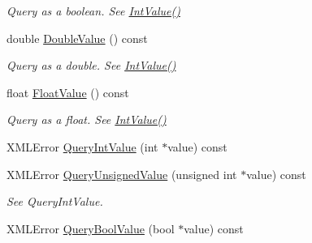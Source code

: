 \begin{DoxyCompactItemize}
\begin{DoxyCompactList}\small\item\em Query as a boolean. See \hyperlink{classtinyxml2_1_1_x_m_l_attribute_a949d02a5888092cc68c1e29185301863}{Int\+Value()} \end{DoxyCompactList}\item 
\hypertarget{classtinyxml2_1_1_x_m_l_attribute_a336153e5aa1b7ccd6502fc249bfb3fd7}{}double \hyperlink{classtinyxml2_1_1_x_m_l_attribute_a336153e5aa1b7ccd6502fc249bfb3fd7}{Double\+Value} () const \label{classtinyxml2_1_1_x_m_l_attribute_a336153e5aa1b7ccd6502fc249bfb3fd7}

\begin{DoxyCompactList}\small\item\em Query as a double. See \hyperlink{classtinyxml2_1_1_x_m_l_attribute_a949d02a5888092cc68c1e29185301863}{Int\+Value()} \end{DoxyCompactList}\item 
\hypertarget{classtinyxml2_1_1_x_m_l_attribute_ae3d51ff98eacc1dc46efcfdaee5c84ad}{}float \hyperlink{classtinyxml2_1_1_x_m_l_attribute_ae3d51ff98eacc1dc46efcfdaee5c84ad}{Float\+Value} () const \label{classtinyxml2_1_1_x_m_l_attribute_ae3d51ff98eacc1dc46efcfdaee5c84ad}

\begin{DoxyCompactList}\small\item\em Query as a float. See \hyperlink{classtinyxml2_1_1_x_m_l_attribute_a949d02a5888092cc68c1e29185301863}{Int\+Value()} \end{DoxyCompactList}\item 
X\+M\+L\+Error \hyperlink{classtinyxml2_1_1_x_m_l_attribute_ad510a83c4ff2755844bb250b125d28ff}{Query\+Int\+Value} (int $\ast$value) const 
\item 
\hypertarget{classtinyxml2_1_1_x_m_l_attribute_ac93f5981adfd62ac4ea76bfa668ee2b4}{}X\+M\+L\+Error \hyperlink{classtinyxml2_1_1_x_m_l_attribute_ac93f5981adfd62ac4ea76bfa668ee2b4}{Query\+Unsigned\+Value} (unsigned int $\ast$value) const \label{classtinyxml2_1_1_x_m_l_attribute_ac93f5981adfd62ac4ea76bfa668ee2b4}

\begin{DoxyCompactList}\small\item\em See Query\+Int\+Value. \end{DoxyCompactList}\item 
\hypertarget{classtinyxml2_1_1_x_m_l_attribute_a9e9b94369f182df72aaac9acd04afead}{}X\+M\+L\+Error \hyperlink{classtinyxml2_1_1_x_m_l_attribute_a9e9b94369f182df72aaac9acd04afead}{Query\+Bool\+Value} (bool $\ast$value) const \label{classtinyxml2_1_1_x_m_l_attribute_a9e9b94369f182df72aaac9acd04afead}


\end{DoxyCompactItemize}
